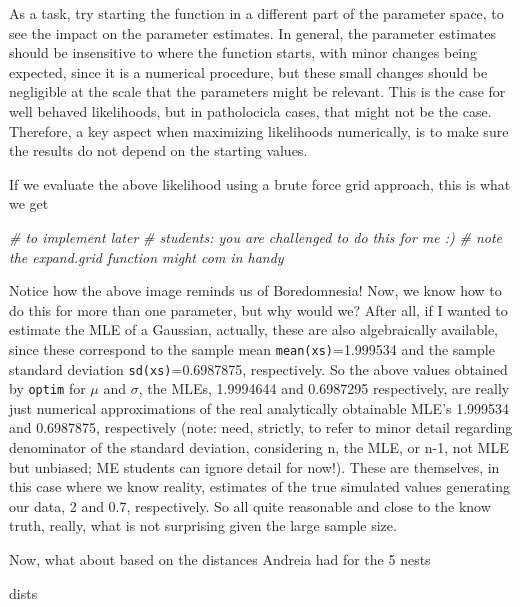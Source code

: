 \documentclass[
]{book}
\newenvironment{Shaded}{\begin{snugshade}}{\end{snugshade}}
\newcommand{\CommentTok}[1]{\textcolor[rgb]{0.56,0.35,0.01}{\textit{#1}}}
\newcommand{\NormalTok}[1]{#1}
\begin{document}
As a task, try starting the function in a different part of the parameter space, to see the impact on the parameter estimates. In general, the parameter estimates should be insensitive to where the function starts, with minor changes being expected, since it is a numerical procedure, but these small changes should be negligible at the scale that the parameters might be relevant. This is the case for well behaved likelihoods, but in patholocicla cases, that might not be the case. Therefore, a key aspect when maximizing likelihoods numerically, is to make sure the results do not depend on the starting values.

If we evaluate the above likelihood using a brute force grid approach, this is what we get

\begin{Shaded}
\begin{Highlighting}[]
\CommentTok{\# to implement later}
\CommentTok{\# students: you are challenged to do this for me :)}
\CommentTok{\# note the expand.grid function might com in handy}
\end{Highlighting}
\end{Shaded}

Notice how the above image reminds us of Boredomnesia! Now, we know how to do this for more than one parameter, but why would we? After all, if I wanted to estimate the MLE of a Gaussian, actually, these are also algebraically available, since these correspond to the sample mean \texttt{mean(xs)}=1.999534 and the sample standard deviation \texttt{sd(xs)}=0.6987875, respectively. So the above values obtained by \texttt{optim} for \(\mu\) and \(\sigma\), the MLEs, 1.9994644 and 0.6987295 respectively, are really just numerical approximations of the real analytically obtainable MLE's 1.999534 and 0.6987875, respectively (note: need, strictly, to refer to minor detail regarding denominator of the standard deviation, considering n, the MLE, or n-1, not MLE but unbiased; ME students can ignore detail for now!). These are themselves, in this case where we know reality, estimates of the true simulated values generating our data, 2 and 0.7, respectively. So all quite reasonable and close to the know truth, really, what is not surprising given the large sample size.

Now, what about based on the distances Andreia had for the 5 nests

\begin{Shaded}
\begin{Highlighting}[]
\NormalTok{dists}
\end{Highlighting}
\end{Shaded}
\end{document}

